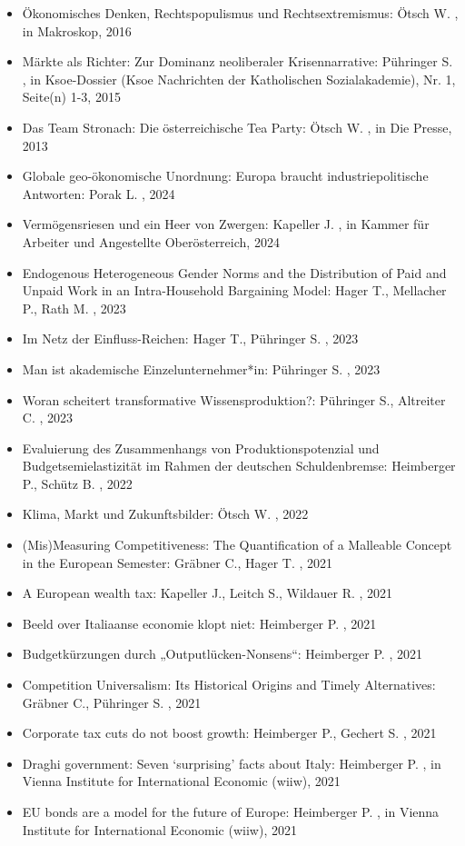 \begin{itemize}
\item Ökonomisches Denken, Rechtspopulismus und Rechtsextremismus: Ötsch W. , in Makroskop, 2016
\item Märkte als Richter: Zur Dominanz neoliberaler Krisennarrative: Pühringer S. , in Ksoe-Dossier (Ksoe Nachrichten der Katholischen Sozialakademie), Nr. 1, Seite(n) 1-3, 2015
\item Das Team Stronach: Die österreichische Tea Party: Ötsch W. , in Die Presse, 2013
\item Globale geo-ökonomische Unordnung: Europa braucht industriepolitische Antworten: Porak L. , 2024
\item Vermögensriesen und ein Heer von Zwergen: Kapeller J. , in Kammer für Arbeiter und Angestellte Oberösterreich, 2024
\item Endogenous Heterogeneous Gender Norms and the Distribution of Paid and Unpaid Work in an Intra-Household Bargaining Model: Hager T., Mellacher P., Rath M. , 2023
\item Im Netz der Einfluss-Reichen: Hager T., Pühringer S. , 2023
\item Man ist akademische Einzelunternehmer*in: Pühringer S. , 2023
\item Woran scheitert transformative Wissensproduktion?: Pühringer S., Altreiter C. , 2023
\item Evaluierung des Zusammenhangs von Produktionspotenzial und Budgetsemielastizität im Rahmen der deutschen Schuldenbremse: Heimberger P., Schütz B. , 2022
\item Klima, Markt und Zukunftsbilder: Ötsch W. , 2022
\item (Mis)Measuring Competitiveness:  The Quantification of a Malleable Concept in the European Semester: Gräbner C., Hager T. , 2021
\item A European wealth tax: Kapeller J., Leitch S., Wildauer R. , 2021
\item Beeld over Italiaanse economie klopt niet: Heimberger P. , 2021
\item Budgetkürzungen durch „Outputlücken-Nonsens“: Heimberger P. , 2021
\item Competition Universalism: Its Historical Origins and Timely Alternatives: Gräbner C., Pühringer S. , 2021
\item Corporate tax cuts do not boost growth: Heimberger P., Gechert S. , 2021
\item Draghi government: Seven ‘surprising’ facts about Italy: Heimberger P. , in Vienna Institute for International Economic (wiiw), 2021
\item EU bonds are a model for the future of Europe: Heimberger P. , in Vienna Institute for International Economic (wiiw), 2021

\end{itemize}
